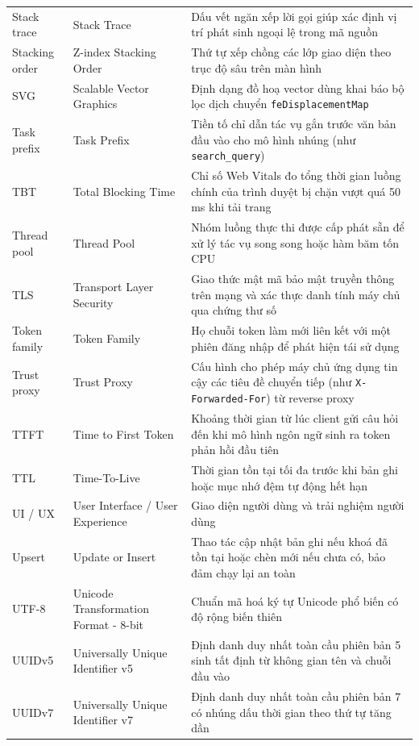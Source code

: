 {\begin{longtable}{@{}>{\raggedright\arraybackslash}p{3.4cm}>{\raggedright\arraybackslash}p{4.7cm}>{\raggedright\arraybackslash}p{7.15cm}@{}}
    Stack trace & Stack Trace & Dấu vết ngăn xếp lời gọi giúp xác định vị trí phát sinh ngoại lệ trong mã nguồn \\
    Stacking order & Z-index Stacking Order & Thứ tự xếp chồng các lớp giao diện theo trục độ sâu trên màn hình \\
    SVG & Scalable Vector Graphics & Định dạng đồ hoạ vector dùng khai báo bộ lọc dịch chuyển \texttt{feDisplacementMap} \\
    Task prefix & Task Prefix & Tiền tố chỉ dẫn tác vụ gắn trước văn bản đầu vào cho mô hình nhúng (như \texttt{search\_query}) \\
    TBT & Total Blocking Time & Chỉ số Web Vitals đo tổng thời gian luồng chính của trình duyệt bị chặn vượt quá 50 ms khi tải trang \\
    Thread pool & Thread Pool & Nhóm luồng thực thi được cấp phát sẵn để xử lý tác vụ song song hoặc hàm băm tốn CPU \\
    TLS & Transport Layer Security & Giao thức mật mã bảo mật truyền thông trên mạng và xác thực danh tính máy chủ qua chứng thư số \\
    Token family & Token Family & Họ chuỗi token làm mới liên kết với một phiên đăng nhập để phát hiện tái sử dụng \\
    Trust proxy & Trust Proxy & Cấu hình cho phép máy chủ ứng dụng tin cậy các tiêu đề chuyển tiếp (như \texttt{X-Forwarded-For}) từ reverse proxy \\
    TTFT & Time to First Token & Khoảng thời gian từ lúc client gửi câu hỏi đến khi mô hình ngôn ngữ sinh ra token phản hồi đầu tiên \\
    TTL & Time-To-Live & Thời gian tồn tại tối đa trước khi bản ghi hoặc mục nhớ đệm tự động hết hạn \\
    UI / UX & User Interface / User Experience & Giao diện người dùng và trải nghiệm người dùng \\
    Upsert & Update or Insert & Thao tác cập nhật bản ghi nếu khoá đã tồn tại hoặc chèn mới nếu chưa có, bảo đảm chạy lại an toàn \\
    UTF-8 & Unicode Transformation Format - 8-bit & Chuẩn mã hoá ký tự Unicode phổ biến có độ rộng biến thiên \\
    UUIDv5 & Universally Unique Identifier v5 & Định danh duy nhất toàn cầu phiên bản 5 sinh tất định từ không gian tên và chuỗi đầu vào \\
    UUIDv7 & Universally Unique Identifier v7 & Định danh duy nhất toàn cầu phiên bản 7 có nhúng dấu thời gian theo thứ tự tăng dần \\

\end{longtable}}
